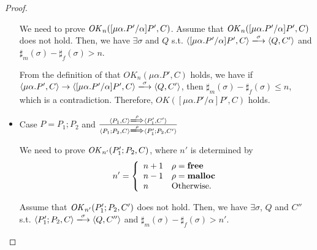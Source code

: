 \begin{proof}
\begin{itemize}
  We need to prove \(\mathit{OK}_n([\mu\alpha.P'/\alpha]P', C) \).  Assume
  that \(\mathit{OK}_n( [\mu\alpha.P'/\alpha]P', C) \) does not hold. Then, we
  have \( \exists \sigma \) and \(Q\) s.t. \( \langle
  [\mu\alpha.P'/\alpha]P', C \rangle \xlongrightarrow{\sigma} \langle
  Q, C' \rangle \) and \(\sharp_{m}(\sigma) -
  \sharp_{f}(\sigma) > n\).

  From the definition of that \(OK_n(\mu\alpha.P', C)\) holds, we have
  if \( \langle \mu\alpha.P', C \rangle \rightarrow \langle
  [\mu\alpha.P'/\alpha]P', C \rangle \xlongrightarrow{\sigma} \langle
  Q, C' \rangle \), then \(\sharp_m(\sigma) -
  \sharp_f(\sigma) \le n \), which is a contradiction. Therefore,
  \(OK([\mu\alpha.P'/\alpha]P', C) \) holds.




\item Case \( P = P_1;P_2 \) and \( \frac{ \langle P_1, C \rangle
  \xLongrightarrow{\rho} \langle P_1', C' \rangle} { \langle P_1;P_2,
  C \rangle \xLongrightarrow{\rho} \langle P_1';P_2, C' \rangle } \)

  We need to prove \(\mathit{OK}_{n'}(P_1';P_2, C) \), where \(n'\) is
  determined by 
  \[
   n'=\left\{
   \begin{array}{ll}
     n + 1 & \rho = \mathbf{free}\\
     n - 1 & \rho = \mathbf{malloc}\\
     n & \mbox{Otherwise.}
   \end{array}
   \right.
   \]

  Assume that \(\mathit{OK}_{n'}(P_1';P_2, C') \) does not hold. Then, we have
  \( \exists \sigma \), \(Q\) and \(C''\) s.t. \( \langle P_1';P_2, C
  \rangle \xlongrightarrow{\sigma} \langle Q, C'' \rangle \) and
  \(\sharp_{m}(\sigma) - \sharp_{f}(\sigma) > n'\).


\end{itemize}
\end{proof}
